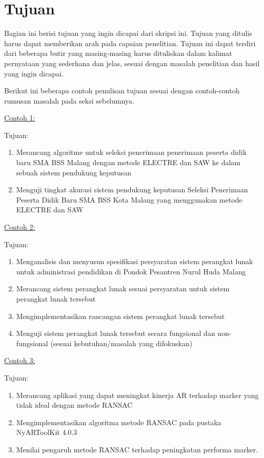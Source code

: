 \section{Tujuan}

Bagian ini berisi tujuan yang ingin dicapai dari skripsi ini. Tujuan yang ditulis harus dapat memberikan arah pada capaian penelitian. Tujuan ini dapat terdiri dari beberapa butir yang masing-masing harus dituliskan dalam kalimat pernyataan yang sederhana dan jelas, sesuai dengan masalah penelitian dan hasil yang ingin dicapai. 

Berikut ini beberapa contoh penulisan tujuan sesuai dengan contoh-contoh rumusan masalah pada seksi sebelumnya.

\noindent\underline{Contoh 1:}

\noindent Tujuan:
\begin{enumerate}
  \item Merancang algoritme untuk seleksi penerimaan penerimaan peserta didik baru SMA BSS Malang dengan metode ELECTRE dan SAW ke dalam sebuah sistem pendukung keputusan
  \item Menguji tingkat akurasi sistem pendukung keputusan Seleksi Penerimaan Peserta Didik Baru SMA BSS Kota Malang yang menggunakan metode ELECTRE dan SAW 
\end{enumerate}

\noindent\underline{Contoh 2:}

\noindent Tujuan:
\begin{enumerate}
  \item Menganalisis dan menyusun spesifikasi persyaratan sistem perangkat lunak untuk administrasi pendidikan di Pondok Pesantren Nurul Huda Malang
  \item Merancang sistem perangkat lunak sesuai persyaratan untuk sistem perangkat lunak tersebut
  \item Mengimplementasikan rancangan sistem perangkat lunak tersebut
  \item Menguji sistem perangkat lunak tersebut secara fungsional dan non-fungsional (sesuai kebutuhan/masalah yang difokuskan)
\end{enumerate}

\noindent\underline{Contoh 3:}

\noindent Tujuan:
\begin{enumerate}
  \item Merancang aplikasi yang dapat meningkat kinerja AR terhadap marker yang tidak ideal dengan metode RANSAC
  \item Mengimplementasikan algoritma metode RANSAC pada pustaka NyARToolKit 4.0.3
  \item Menilai pengaruh metode RANSAC terhadap peningkatan performa marker. 
\end{enumerate}

